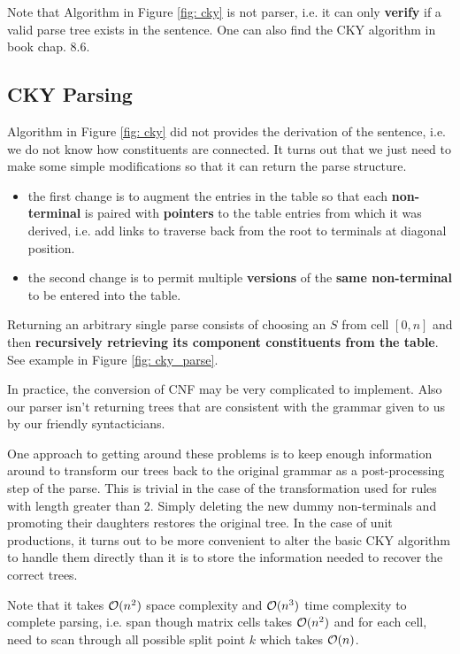 \documentclass[11pt]{article}
\begin{document}
Note that Algorithm in Figure \ref{fig: cky} is not parser, i.e. it can only \textbf{verify} if a valid parse tree exists in the sentence. One can also find the CKY algorithm in book \citep{skiena2020algorithm} chap. 8.6. 


\subsection{CKY Parsing}
Algorithm in Figure \ref{fig: cky} did not provides the derivation of the sentence, i.e. we do not know how constituents are connected. It turns out that we just need to make some simple modifications so that it can return the parse structure. 
\begin{itemize}
\item the first change is to augment the entries in the table so that each \textbf{non-terminal} is paired with \textbf{pointers} to the table entries from which it was derived, i.e. add links to traverse back from the root to terminals at diagonal position.
\item the second change is to permit multiple \textbf{versions} of the \textbf{same non-terminal} to be entered into the table.
\end{itemize}
Returning an arbitrary single parse consists of choosing an $S$ from cell $[0,n]$ and then\textbf{ recursively retrieving its component constituents from the table}. See example in Figure \ref{fig: cky_parse}. 

In practice, the conversion of CNF may be very complicated to implement. Also our parser isn’t returning trees that are consistent with the grammar given to us by our friendly syntacticians. 

One approach to getting around these problems is to keep enough information around to transform our trees back to the original grammar as a post-processing step
of the parse. This is trivial in the case of the transformation used for rules with length greater than 2. Simply deleting the new dummy non-terminals and promoting their
daughters restores the original tree. In the case of unit productions, it turns out to be more convenient to alter the basic CKY algorithm to handle them directly than it is to store the information needed
to recover the correct trees. 

Note that it takes ${\mathcal O}(n^2)$ space complexity and ${\mathcal O}(n^3)$ time complexity to complete parsing, i.e. span though matrix cells takes ${\mathcal O}(n^2)$ and for each cell, need to scan through all possible split point $k$ which takes ${\mathcal O}(n)$. 
\end{document}
